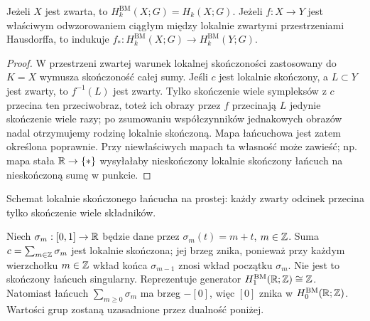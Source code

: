 \begin{stwierdzenie}
\label{prop:BM-proper-v11}
Jeżeli $X$ jest zwarta, to $H_k^{\mathrm{BM}}(X;G)=H_k(X;G)$.
Jeżeli $f:X\to Y$ jest właściwym odwzorowaniem ciągłym
między lokalnie zwartymi przestrzeniami Hausdorffa,
to indukuje $f_*:H_k^{\mathrm{BM}}(X;G)\to H_k^{\mathrm{BM}}(Y;G)$.
\end{stwierdzenie}
\begin{proof}
W przestrzeni zwartej warunek lokalnej skończoności
zastosowany do $K=X$ wymusza skończoność całej sumy.
Jeśli $c$ jest lokalnie skończony, a $L\subset Y$ jest zwarty,
to $f^{-1}(L)$ jest zwarty. Tylko skończenie wiele
sympleksów z $c$ przecina ten przeciwobraz, toteż
ich obrazy przez $f$ przecinają $L$ jedynie skończenie
wiele razy; po zsumowaniu współczynników jednakowych
obrazów nadal otrzymujemy rodzinę lokalnie skończoną.
Mapa łańcuchowa jest zatem określona
poprawnie. Przy niewłaściwych mapach ta własność
może zawieść; np. mapa stała $\mathbb{R}\to\{*\}$
wysyłałaby nieskończony lokalnie skończony łańcuch
na nieskończoną sumę w punkcie.
\end{proof}

\begin{center}
\par\smallskip\small Schemat lokalnie skończonego łańcucha na prostej:
każdy zwarty odcinek przecina tylko skończenie wiele składników.
\end{center}

\begin{przyklad}
\label{ex:BM-line-v11}
Niech $\sigma_m:[0,1]\to\mathbb{R}$ będzie dane przez
$\sigma_m(t)=m+t$, $m\in\mathbb{Z}$. Suma
$c=\sum_{m\in\mathbb{Z}}\sigma_m$ jest lokalnie skończona;
jej brzeg znika, ponieważ przy każdym wierzchołku
$m\in\mathbb{Z}$ wkład końca $\sigma_{m-1}$ znosi wkład
początku $\sigma_m$. Nie jest to skończony łańcuch
singularny. Reprezentuje generator
$H_1^{\mathrm{BM}}(\mathbb{R};\mathbb{Z})\cong\mathbb{Z}$.
Natomiast łańcuch $\sum_{m\ge0}\sigma_m$ ma brzeg
$-[0]$, więc $[0]$ znika w $H_0^{\mathrm{BM}}(\mathbb{R};\mathbb{Z})$.
Wartości grup zostaną uzasadnione przez dualność poniżej.
\end{przyklad}

